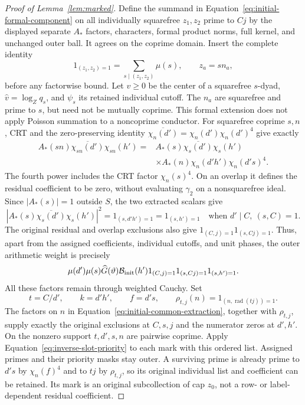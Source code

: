 \documentclass[11pt,a4paper]{article}
\numberwithin{equation}{section}
\numberwithin{figure}{section}
\theoremstyle{definition}
\theoremstyle{remark}
\begin{document}
\begin{proof}[Proof of Lemma~\ref{lem:marked}]
Define the summand in Equation~\eqref{eq:initial-formal-component}
on all individually squarefree \(z_1,z_2\) prime to \(Cj\) by the
displayed separate \(A_*\) factors, characters, formal product norms,
full kernel, and unchanged outer ball.  It agrees on the coprime
domain.  Insert the complete identity
\[
 1_{(z_1,z_2)=1}=\sum_{s\mid(z_1,z_2)}\mu(s),\qquad z_a=sn_a,
\]
before any factorwise bound.  Let \(v\ge0\) be the center of a
squarefree \(s\)-dyad, \(\widehat v=\log_Zq_s\), and \(\psi_s\)
its retained individual cutoff.  The \(n_a\) are squarefree and
prime to \(s\), but need not be mutually coprime.  This formal
extension does not apply Poisson summation to a noncoprime conductor.
For squarefree coprime \(s,n\), CRT and the zero-preserving identity
\(\overline{\chi_n(d')}=\chi_n(d')\chi_n(d')^4\) give exactly
\begin{equation}\label{eq:initial-common-extraction}
 \begin{split}
 A_*(sn)\overline{\chi_{sn}(d')}\chi_{sn}(h')
 ={}&A_*(s)\overline{\chi_s(d')}\chi_s(h')\\
 &\times A_*(n)\chi_n(d'h')\chi_n(d's)^4.
 \end{split}
\end{equation}
The fourth power includes the CRT factor \(\chi_n(s)^4\).
On an overlap it defines the residual coefficient to be zero, without
evaluating \(\gamma_2\) on a nonsquarefree ideal.  Since \(|A_*(s)|=1\)
outside \(S\), the two extracted scalars give
\[
 |A_*(s)\overline{\chi_s(d')}\chi_s(h')|^2
 =1_{(s,d'h')=1}=1_{(s,h')=1}
 \quad\text{when }d'\mid C,\ (s,C)=1.
\]
The original residual and overlap exclusions also give
\(1_{(C,j)=1}1_{(s,Cj)=1}\).  Thus, apart from the assigned
coefficients, individual cutoffs, and unit phases, the outer arithmetic
weight is precisely
\begin{equation}\label{eq:initial-outer-arithmetic}
 \mu(d')\mu(s)\widehat G(\vartheta)\mathcal B_{\rm init}(h')
 1_{(C,j)=1}1_{(s,Cj)=1}1_{(s,h')=1}.
\end{equation}
All these factors remain through weighted Cauchy.  Set
\[
 t=C/d',\qquad k=d'h',\qquad f=d's,\qquad
 \rho_{t,j}(n)=1_{(n,\operatorname{rad}(tj))=1}.
\]
The factors on \(n\) in Equation~\eqref{eq:initial-common-extraction},
together with \(\rho_{t,j}\), supply exactly the original exclusions
at \(C,s,j\) and the numerator zeros at \(d',h'\).  On the nonzero
support \(t,d',s,n\) are pairwise coprime.  Apply
Equation~\eqref{eq:inverse-slot-priority} to each mark with this
ordered list.  Assigned primes and their priority masks stay outer.
A surviving prime is already prime to \(d's\) by \(\chi_n(f)^4\)
and to \(tj\) by \(\rho_{t,j}\), so its original individual list and
coefficient can be retained.  Its mark is an original subcollection
of cap \(z_0\), not a row- or label-dependent residual coefficient.


\end{proof}
\end{document}
